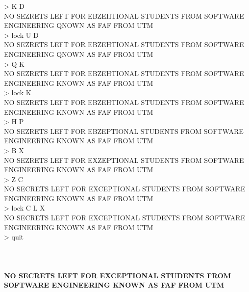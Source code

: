 \documentclass[12pt]{article}
\begin{document}
> K D\\
NO SEZRETS LEFT FOR EBZEHTIONAL STUDENTS FROM SOFTWARE ENGINEERING QNOWN AS FAF FROM UTM\\
> lock U D\\
NO SEZRETS LEFT FOR EBZEHTIONAL STUDENTS FROM SOFTWARE ENGINEERING QNOWN AS FAF FROM UTM\\
> Q K\\
NO SEZRETS LEFT FOR EBZEHTIONAL STUDENTS FROM SOFTWARE ENGINEERING KNOWN AS FAF FROM UTM\\
> lock K\\
NO SEZRETS LEFT FOR EBZEHTIONAL STUDENTS FROM SOFTWARE ENGINEERING KNOWN AS FAF FROM UTM\\
> H P\\
NO SEZRETS LEFT FOR EBZEPTIONAL STUDENTS FROM SOFTWARE ENGINEERING KNOWN AS FAF FROM UTM\\
> B X\\
NO SEZRETS LEFT FOR EXZEPTIONAL STUDENTS FROM SOFTWARE ENGINEERING KNOWN AS FAF FROM UTM\\
> Z C\\
NO SECRETS LEFT FOR EXCEPTIONAL STUDENTS FROM SOFTWARE ENGINEERING KNOWN AS FAF FROM UTM\\
> lock C L X\\
NO SECRETS LEFT FOR EXCEPTIONAL STUDENTS FROM SOFTWARE ENGINEERING KNOWN AS FAF FROM UTM\\
> quit \\\\\\\\

\textbf{NO SECRETS LEFT FOR EXCEPTIONAL STUDENTS FROM SOFTWARE ENGINEERING KNOWN AS FAF FROM UTM}
\end{document}
